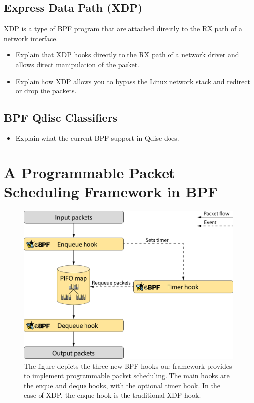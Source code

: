\documentclass[sigconf, nonacm]{acmart}
\begin{document}
\subsection{Express Data Path (XDP)}

XDP is a type of BPF program that are attached directly to the RX path of a
network interface.

\begin{itemize}
  \item Explain that XDP hooks directly to the RX path of a network driver and allows direct manipulation of the packet.
  \item Explain how XDP allows you to bypass the Linux network stack and redirect or drop the packets.
\end{itemize}


\subsection{BPF Qdisc Classifiers}

\begin{itemize}
  \item Explain what the current BPF support in Qdisc does.
\end{itemize}


\section{A Programmable Packet Scheduling Framework in BPF}

\begin{figure}

  \includegraphics[width=\linewidth]{bpf_pps_flow.pdf}

  \caption{The figure depicts the three new BPF hooks our framework provides to
           implement programmable packet scheduling. The main hooks are the enque and deque
           hooks, with the optional timer hook. In the case of XDP, the enque hook is the
           traditional XDP hook.\label{fig:bpf_pps_flow}}
\end{figure}
\end{document}
